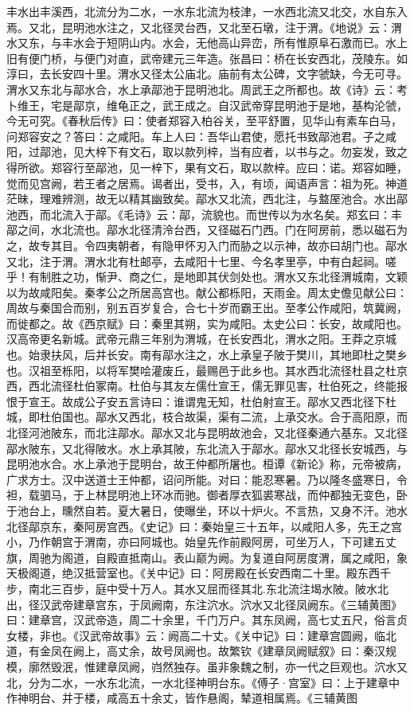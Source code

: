 \documentclass[12pt,UTF8]{ctexbook}
\begin{document}
丰水出丰溪西，北流分为二水，一水东北流为枝津，一水西北流又北交，水自东入焉。又北，昆明池水注之，又北径灵台西，又北至石墩，注于渭。《地说》云：渭水又东，与丰水会于短阴山内。水会，无他高山异峦，所有惟原阜石激而已。水上旧有便门桥，与便门对直，武帝建元三年造。张昌曰：桥在长安西北，茂陵东。如淳曰，去长安四十里。渭水又径太公庙北。庙前有太公碑，文字虢缺，今无可寻。渭水又东北与鄗水合，水上承鄗池于昆明池北。周武王之所都也。故《诗》云：考卜维王，宅是鄗京，维龟正之，武王成之。自汉武帝穿昆明池于是地，基构沦虢，今无可究。《春秋后传》曰：使者郑容入柏谷关，至平舒置，见华山有素车白马，问郑容安之？答曰：之咸阳。车上人曰：吾华山君使，愿托书致鄗池君。子之咸阳，过鄗池，见大梓下有文石，取以款列梓，当有应者，以书与之。勿妄发，致之得所欲。郑容行至鄗池，见一梓下，果有文石，取以款梓。应曰：诺。郑容如睡，觉而见宫阙，若王者之居焉。谒者出，受书，入，有顷，闻语声言：祖为死。神道茫昧，理难辨测，故无以精其幽致矣。鄗水又北流，西北注，与盩厔池合。水出鄗池西，而北流入于鄗。《毛诗》云：鄗，流貌也。而世传以为水名矣。郑玄曰：丰鄗之间，水北流也。鄗水北径清泠台西，又径磁石门西。门在阿房前，悉以磁石为之，故专其目。令四夷朝者，有隐甲怀刃入门而胁之以示神，故亦曰胡门也。鄗水又北，注于渭。渭水北有杜邮亭，去咸阳十七里、今名孝里亭，中有白起祠。嗟乎！有制胜之功，惭尹、商之仁，是地即其伏剑处也。渭水又东北径渭城南，文颖以为故咸阳矣。秦孝公之所居高宫也。献公都栎阳，天雨金。周太史儋见献公曰：周故与秦国合而别，别五百岁复合，合七十岁而霸王出。至孝公作咸阳，筑冀阙，而徙都之。故《西京赋》曰：秦里其朔，实为咸阳。太史公曰：长安，故咸阳也。汉高帝更名新城。武帝元鼎三年别为渭城，在长安西北，渭水之阳。王莽之京城也。始隶扶风，后并长安。南有鄗水注之，水上承皇子陂于樊川，其地即杜之樊乡也。汉祖至栎阳，以将军樊哙灌废丘，最赐邑于此乡也。其水西北流径杜县之杜京西，西北流径杜伯冢南。杜伯与其友左儒仕宣王，儒无罪见害，杜伯死之，终能报恨于宣王。故成公子安五言诗曰：谁谓鬼无知，杜伯射宣王。鄗水又西北径下杜城，即杜伯国也。鄗水又西北，枝合故渠，渠有二流，上承交水。合于高阳原，而北径河池陂东，而北注鄗水。鄗水又北与昆明故池会，又北径秦通六基东。又北径鄗水陂东，又北得陂水。水上承其陂，东北流入于鄗水。鄗水又北径长安城西，与昆明池水合。水上承池于昆明台，故王仲都所屠也。桓谭《新论》称，元帝被病，广求方士。汉中送道士王仲都，诏问所能。对曰：能忍寒暑。乃以隆冬盛寒日，令袒，载驷马，于上林昆明池上环冰而驰。御者厚衣狐裘寒战，而仲都独无变色，卧于池台上，曛然自若。夏大暑日，使曝坐，环以十炉火。不言热，又身不汗。池水北径鄗京东，秦阿房宫西。《史记》曰：秦始皇三十五年，以咸阳人多，先王之宫小，乃作朝宫于渭南，亦曰阿城也。始皇先作前殿阿房，可坐万人，下可建五丈旗，周驰为阁道，自殿直抵南山。表山巅为阙。为复道自阿房度渭，属之咸阳，象天极阁道，绝汉抵营室也。《关中记》曰：阿房殿在长安西南二十里。殿东西千步，南北三百步，庭中受十万人。其水又屈而径其北.东北流注堨水陂。陂水北出，径汉武帝建章宫东，于凤阙南，东注泬水。泬水又北径凤阙东。《三辅黄图》曰：建章宫，汉武帝造，周二十余里，千门万户。其东凤阙，高七丈五尺，俗言贞女楼，非也。《汉武帝故事》云：阙高二十丈。《关中记》曰：建章宫圆阙，临北道，有金凤在阙上，高丈余，故号凤阙也。故繁钦《建章凤阙赋叙》曰：秦汉规模，廓然毁泯，惟建章凤阙，岿然独存。虽非象魏之制，亦一代之巨观也。泬水又北，分为二水，一水东北流，一水北径神明台东。《傅子·宫室》曰：上于建章中作神明台、并于楼，咸高五十余丈，皆作悬阁，辇道相属焉。《三辅黄图
\end{document}
